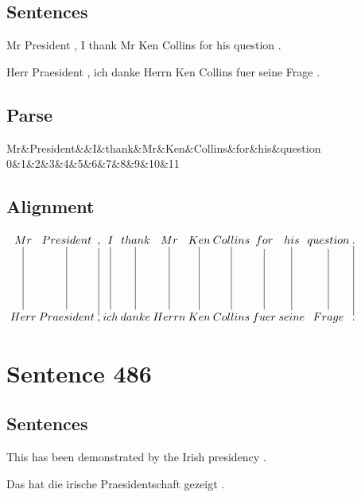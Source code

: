\documentclass{report}
\begin{document}
\subsection*{Sentences}
Mr President , I thank Mr Ken Collins for his question .

\noindent Herr Praesident , ich danke Herrn Ken Collins fuer seine Frage .



\subsection*{Parse}
\begin{dependency}[theme=simple]
\begin{deptext}[column sep=.5cm, row sep=.1ex]
Mr\&President\&\&I\&thank\&Mr\&Ken\&Collins\&for\&his\&question\\
0\&1\&2\&3\&4\&5\&6\&7\&8\&9\&10\&11\\
\end{deptext}
\end{dependency}


\subsection*{Alignment}
\scriptsize{
$
\xymatrix@C-2.3pc{
Mr \ar @{-} [dd] & President \ar @{-} [dd] & , \ar @{-} [dd] & I \ar @{-} [dd] & thank \ar @{-} [dd] & Mr \ar @{-} [dd] & Ken \ar @{-} [dd] & Collins \ar @{-} [dd] & for \ar @{-} [dd] & his \ar @{-} [dd] & question \ar @{-} [dd] & . \ar @{-} [dd]\\\\
Herr & Praesident & , & ich & danke & Herrn & Ken & Collins & fuer & seine & Frage & .
}$}
\newpage\section*{Sentence 486}

\subsection*{Sentences}
This has been demonstrated by the Irish presidency .

\noindent Das hat die irische Praesidentschaft gezeigt .
\end{document}
